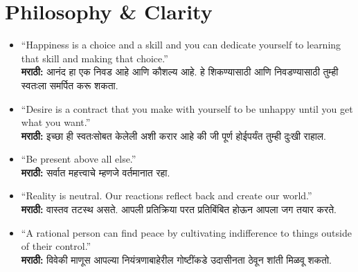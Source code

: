 \section*{Philosophy \& Clarity}
\begin{itemize}
    \item ``Happiness is a choice and a skill and you can dedicate yourself to learning that skill and making that choice.'' \\
    \textbf{मराठी:} आनंद हा एक निवड आहे आणि कौशल्य आहे. हे शिकण्यासाठी आणि निवडण्यासाठी तुम्ही स्वतःला समर्पित करू शकता.

    \item ``Desire is a contract that you make with yourself to be unhappy until you get what you want.'' \\
    \textbf{मराठी:} इच्छा ही स्वतःसोबत केलेली अशी करार आहे की जी पूर्ण होईपर्यंत तुम्ही दुःखी राहाल.

    \item ``Be present above all else.'' \\
    \textbf{मराठी:} सर्वात महत्त्वाचे म्हणजे वर्तमानात रहा.

    \item ``Reality is neutral. Our reactions reflect back and create our world.'' \\
    \textbf{मराठी:} वास्तव तटस्थ असते. आपली प्रतिक्रिया परत प्रतिबिंबित होऊन आपला जग तयार करते.

    \item ``A rational person can find peace by cultivating indifference to things outside of their control.'' \\
    \textbf{मराठी:} विवेकी माणूस आपल्या नियंत्रणाबाहेरील गोष्टींकडे उदासीनता ठेवून शांती मिळवू शकतो.
\end{itemize}


